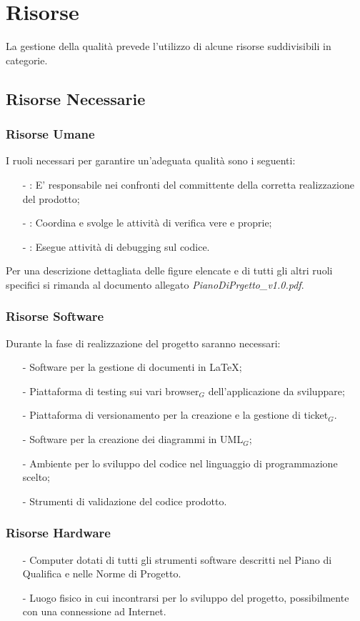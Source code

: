\section{Risorse}
La gestione della qualità prevede l'utilizzo di alcune risorse suddivisibili in categorie.
\subsection{Risorse Necessarie} 
\subsubsection{Risorse Umane}
I ruoli necessari per garantire un'adeguata qualità sono i seguenti:
\begin{itemize}
	\item[-] \textbf{\ruoloResponsabile}: E' responsabile nei confronti del committente della corretta realizzazione del prodotto;
	\item[-] \textbf{\ruoloVerificatore}: Coordina e svolge le attività di verifica vere e proprie;
	\item[-] \textbf{\ruoloProgrammatore}: Esegue attività di debugging sul codice.
\end{itemize}
Per una descrizione dettagliata delle figure elencate e di tutti gli altri ruoli specifici si rimanda al documento allegato \textit{PianoDiPrgetto\_v1.0.pdf}.

\subsubsection{Risorse Software}
Durante la fase di realizzazione del progetto saranno necessari:
\begin{itemize}
	\item[-] Software per la gestione di documenti in \LaTeX;
	\item[-] Piattaforma di testing sui vari browser$_G$ dell'applicazione da sviluppare;
	\item[-] Piattaforma di versionamento per la creazione e la gestione di ticket$_G$.
	\item[-] Software per la creazione dei diagrammi in UML$_G$;
	\item[-] Ambiente per lo sviluppo del codice nel linguaggio di programmazione scelto;
	\item[-] Strumenti di validazione del codice prodotto.
\end{itemize}

\subsubsection{Risorse Hardware}
\begin{itemize}
	\item[-] Computer dotati di tutti gli strumenti software descritti nel Piano di Qualifica e nelle Norme di Progetto.
	\item[-] Luogo fisico in cui incontrarsi per lo sviluppo del progetto, possibilmente con una connessione ad Internet.
\end{itemize}

